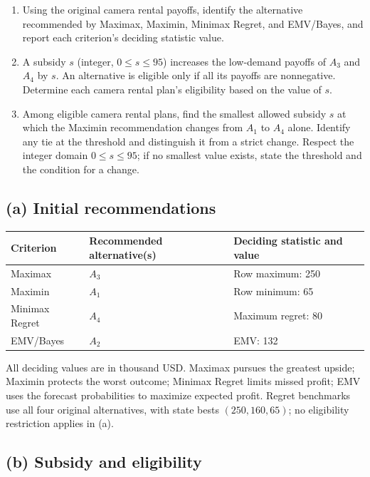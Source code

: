 \begin{enumerate}[label=\textbf{(\alph*)},leftmargin=*]
	\item Using the original camera rental payoffs, identify the alternative recommended by Maximax, Maximin, Minimax Regret, and EMV/Bayes, and report each criterion's deciding statistic value. 

	\item A subsidy $s$ (integer, $0\leq s\leq95$) increases the low-demand payoffs of $A_3$ and $A_4$ by $s$. An alternative is eligible only if all its payoffs are nonnegative. Determine each camera rental plan's eligibility based on the value of $s$. 

	\item Among eligible camera rental plans, find the smallest allowed subsidy $s$ at which the Maximin recommendation changes from $A_1$ to $A_4$ alone. Identify any tie at the threshold and distinguish it from a strict change. Respect the integer domain $0\leq s\leq95$; if no smallest value exists, state the threshold and the condition for a change. 
\end{enumerate}
\label{sol:q1a}
\subsection*{(a) Initial recommendations }
\begin{center}
\begin{tabular}{lll}\toprule
Criterion & Recommended alternative(s) & Deciding statistic and value\\ \midrule
		Maximax & $A_3$ & Row maximum: 250\\
		Maximin & $A_1$ & Row minimum: 65\\
		Minimax Regret & $A_4$ & Maximum regret: 80\\
		EMV/Bayes & $A_2$ & EMV: 132\\
		\bottomrule\end{tabular}
\end{center}
All deciding values are in thousand USD. Maximax pursues the greatest upside; Maximin protects the worst outcome; Minimax Regret limits missed profit; EMV uses the forecast probabilities to maximize expected profit. Regret benchmarks use all four original alternatives, with state bests $(250,160,65)$; no eligibility restriction applies in (a).
\secInicio[sec:q1]


\label{sol:q1b}
\subsection*{(b) Subsidy and eligibility }


